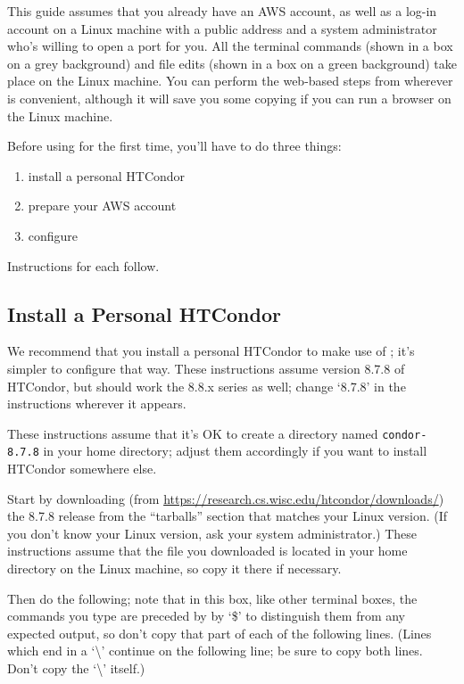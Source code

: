 This guide assumes that you already have an AWS account, as well as a log-in
account on a Linux machine with a public address and a system administrator
who's willing to open a port for you.  All the terminal commands (shown in a
box on a grey background) and file edits (shown in a box on a green
background) take place on the Linux machine.  You can perform the web-based
steps from wherever is convenient, although it will save you some copying if
you can run a browser on the Linux machine.

Before using  for the first time, you'll have to do three things:

\begin{enumerate}
\item install a personal HTCondor
\item prepare your AWS account
\item configure 
\end{enumerate}

Instructions for each follow.

\subsection{Install a Personal HTCondor}

We recommend that you install a personal HTCondor to make use of ;
it's simpler to configure that way.  These instructions assume version 8.7.8
of HTCondor, but should work the 8.8.x series as well; change `8.7.8' in
the instructions wherever it appears.

These instructions assume that it's OK to create a directory named
\texttt{condor-8.7.8} in your home directory; adjust them accordingly if you
want to install HTCondor somewhere else.

Start by downloading (from
\url{https://research.cs.wisc.edu/htcondor/downloads/}) the 8.7.8 release from
the ``tarballs'' section that matches your Linux version.  (If you don't know
your Linux version, ask your system administrator.)  These instructions assume
that the file you downloaded is located in your home directory on the Linux
machine, so copy it there if necessary.

Then do the following; note that in this box, like other terminal boxes,
the commands you type are preceded by by `\$' to distinguish them from any
expected output, so don't copy that part of each of the following lines.
(Lines which end in a `\textbackslash' continue on the following line; be
sure to copy both lines.  Don't copy the `\textbackslash' itself.)

